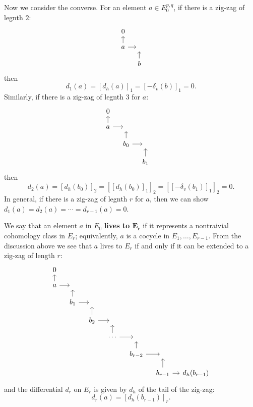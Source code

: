 \begin{remark}
Now we consider the converse. For an element $a\in E_0^{p,q}$, if there is a zig-zag of legnth $2$:
\[\begin{tikzcd}[column sep=1.0 em,row sep=1.0 em]
0&\\
a\ar[u]\ar[r]&{}\\
{}&b\ar[u]
\end{tikzcd}\]
then
\[d_1(a)=[d_h(a)]_1=[-\delta_v(b)]_1=0.\]
Similarly, if there is a zig-zag of legnth $3$ for $a$:
\[\begin{tikzcd}[column sep=1.0 em,row sep=1.0 em]
0&&&\\
a\ar[u]\ar[r]&{}&{}&\\
{}&b_0\ar[u]\ar[r]&{}&\\
{}&{}&b_1\ar[u]&
\end{tikzcd}\]
then
\[d_2(a)=[d_h(b_0)]_2=[[d_h(b_0)]_1]_2=[[-\delta_v(b_1)]_1]_2=0.\]
In general, if there is a zig-zag of legnth $r$ for $a$, then we can show $d_1(a)=d_2(a)=\cdots=d_{r-1}(a)=0$.\par
We say that an element $a$ in $E_0$ \textbf{lives to $\bm{E_{r}}$} if it represents a nontraivial cohomology class in $E_r$; equivalently, $a$ is a cocycle in $E_1,\dots,E_{r-1}$. From 
the discussion above we see that $a$ lives to $E_r$ if and only if it can be extended to a zig-zag of length $r$:
\[\begin{tikzcd}[column sep=1.0 em,row sep=1.0 em]
0&{}&{}&{}&{}&{}&{}\\
a\ar[u]\ar[r]&{}&{}&{}&{}&{}&{}\\
&b_1\ar[u]\ar[r]&{}&{}&{}&{}&{}\\
&&b_2\ar[u]\ar[r]&{}&{}&{}&{}\\
&&&\cdots\ar[u]\ar[r]&{}&{}&{}\\
&&&&b_{r-2}\ar[u]\ar[r]&{}&{}\\
&&&&&b_{r-1}\ar[u]\ar[r]&d_h(b_{r-1})
\end{tikzcd}\]
and the differential $d_r$ on $E_r$ is given by $d_h$ of the tail of the zig-zag:
\[d_r(a)=[d_h(b_{r-1})]_r.\]
\end{remark}

